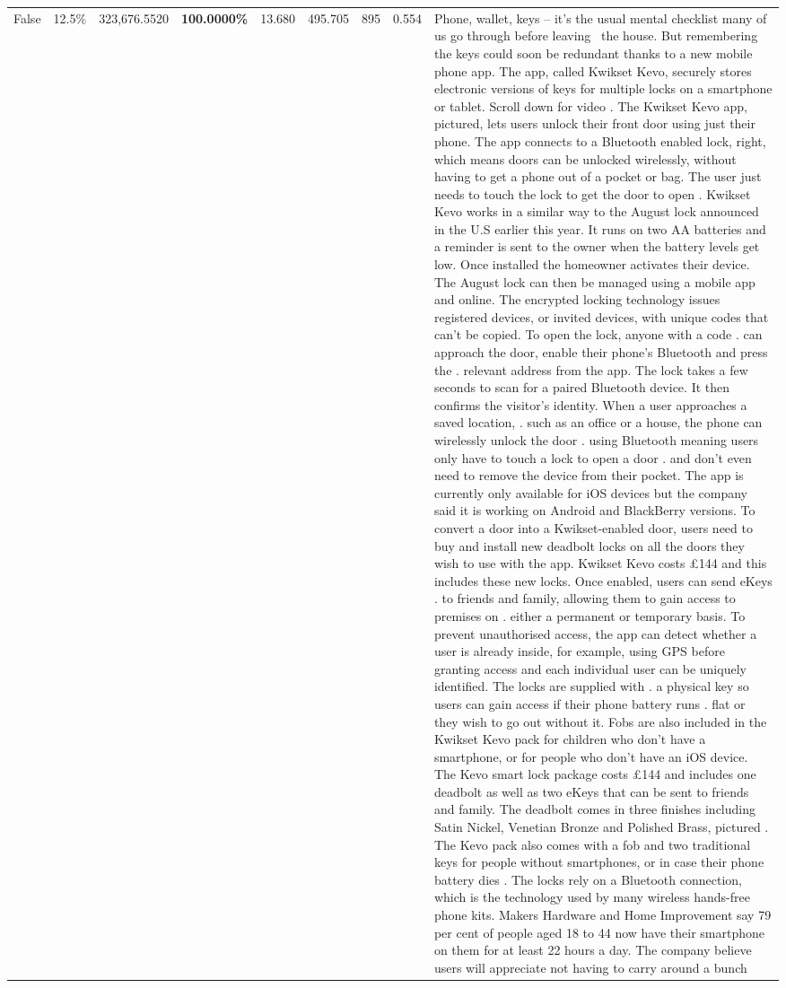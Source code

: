 \begin{table}[H]
\begin{tabular}{lllrlllll}
False & 12.5\% & 323,676.5520 & \bfseries \color{red} 100.0000\% & 13.680 & 495.705 & 895 & 0.554 & Phone, wallet, keys – it’s the usual mental checklist many of us go through before leaving  the house. But remembering the keys could soon be redundant thanks to a new mobile phone app. The app, called Kwikset Kevo, securely stores electronic versions of keys for multiple locks on a smartphone or tablet. Scroll down for video . The Kwikset Kevo app, pictured, lets users unlock their front door using just their phone. The app connects to a Bluetooth enabled lock, right, which means doors can be unlocked wirelessly, without having to get a phone out of a pocket or bag. The user just needs to touch the lock to get the door to open . Kwikset Kevo works in a similar way to the August lock announced in the U.S earlier this year. It runs on two AA batteries and a reminder is sent to the owner when the battery levels get low. Once installed the homeowner activates their device. The August lock can then be managed using a mobile app and online. The encrypted locking technology issues registered devices, or invited devices, with unique codes that can't be copied. To open the lock, anyone with a code . can approach the door, enable their phone's Bluetooth and press the . relevant address from the app. The lock takes a few seconds to scan for a paired Bluetooth device. It then confirms the visitor's identity. When a user approaches a saved location, . such as an office or a house, the phone can wirelessly unlock the door . using Bluetooth meaning users only have to touch a lock to open a door . and don't even need to remove the device from their pocket. The app is currently only available for iOS devices but the company said it is working on Android and BlackBerry versions. To convert a door into a Kwikset-enabled door, users need to buy and install new deadbolt locks on all the doors they wish to use with the app. Kwikset Kevo costs £144 and this includes these new locks. Once enabled, users can send eKeys . to friends and family, allowing them to gain access to premises on . either a permanent or temporary basis. To prevent unauthorised access, the app can detect whether a user is already inside, for example, using GPS before granting access and each individual user can be uniquely identified. The locks are supplied with . a physical key so users can gain access if their phone battery runs . flat or they wish to go out without it. Fobs are also included in the Kwikset Kevo pack for children who don't have a smartphone, or for people who don't have an iOS device. The Kevo smart lock package costs £144 and includes one deadbolt as well as two eKeys that can be sent to friends and family. The deadbolt comes in three finishes including Satin Nickel, Venetian Bronze and Polished Brass, pictured . The Kevo pack also comes with a fob and two traditional keys for people without smartphones, or in case their phone battery dies . The locks rely on a Bluetooth connection, which is the technology used by many wireless hands-free phone kits. Makers Hardware and Home Improvement say 79 per cent of people aged 18 to 44 now have their smartphone on them for at least 22 hours a day. The company believe users will appreciate not having to carry around a bunch 
\end{tabular}
\end{table}
